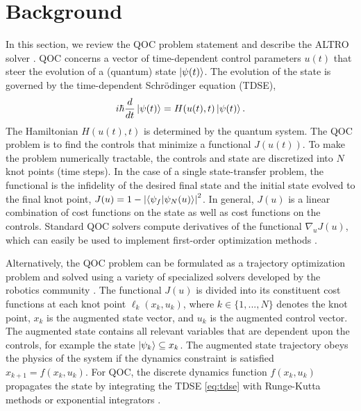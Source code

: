 \section{Background \label{sec:background}}
In this section, we
review the QOC problem statement
and describe the ALTRO solver \cite{howell2019altro}.
QOC concerns a vector of time-dependent control parameters $u(t)$
that steer the evolution of a (quantum) state $\ket{\psi(t)}$.
The evolution of the state is governed by the time-dependent
Schr{\"o}dinger equation (TDSE),
\begin{equation}
  i \hbar \frac{d}{dt} \ket{\psi(t)} = H(u(t), t) \ket{\psi(t)}.
  \label{eq:tdse}
\end{equation}
The Hamiltonian $H(u(t), t)$ is determined by the quantum system.
The QOC problem is to find the
controls that minimize a functional $J(u(t))$.
To make the problem numerically tractable,
the controls and state are discretized into $N$ knot points (time steps).
In the case of a single state-transfer problem, the functional is
the infidelity of the desired final state and the initial state evolved
to the final knot point,
$J(u) = 1 - {\lvert \braket{\psi_{f}}{\psi_{N}(u)} \rvert}^{2}$.
In general, $J(u)$ is a linear combination of cost functions on the state
as well as cost functions on the controls.
Standard QOC solvers compute derivatives of the functional $\nabla_{u} J(u)$,
which can easily be used to implement first-order optimization methods
\cite{machnes2015tunable, khaneja2005optimal, leung2017speedup, goerz2019krotov}.

Alternatively, the QOC problem can be formulated as a trajectory optimization problem 
and solved using a variety of specialized solvers developed by the robotics community
\cite{Schulman13, Tedrake16, Hereid2017FROST, howell2019altro}.
The functional $J(u)$ is divided into its constituent
cost functions at each knot point $\ell_{k}(x_{k}, u_{k})$,
where $k \in \{1, ..., N\}$ denotes the knot point,
$x_{k}$ is the augmented state vector,
and $u_{k}$ is the augmented control vector.
The augmented state contains all relevant variables
that are dependent upon the controls, for example the state
$\ket{\psi_{k}} \subseteq x_{k}$.
The augmented state trajectory obeys the physics of the system if
the dynamics constraint is satisfied
$x_{k + 1} = f(x_{k}, u_{k})$. For QOC, the discrete
dynamics function $f(x_{k}, u_{k})$ propagates the state by
integrating the TDSE \eqref{eq:tdse} with Runge-Kutta methods \cite{jorgensen2011numerical}
or exponential integrators \cite{auer2018magnus, berland2006solving, einkemmer2017performance,
shillito2020fast}.


